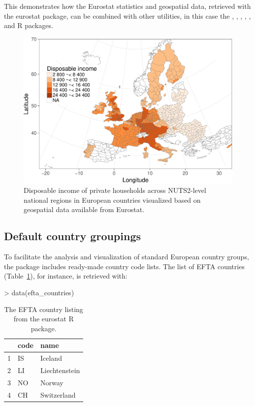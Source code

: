 This demonstrates how the Eurostat statistics and geospatial data,
retrieved with the eurostat package, can be combined with other
utilities, in this case the
 \citep{grid},  \citep{maptools},  \citep{rgdal},
 \citep{rgeos},  \citep{scales}, and
 \citep{stringr} R packages.

\begin{figure}
\begin{center}
\includegraphics{2015-manu-mapexample-1}
\caption{Disposable income of private households across NUTS2-level national regions in European countries visualized based on geospatial data available from Eurostat.}
\label{fig:mapexample}
\end{center}
\end{figure}


\subsection{Default country groupings}

To facilitate the analysis and visualization of standard European
country groups, the  package includes ready-made
country code lists. The list of EFTA countries (Table~\ref{tab:efta}),
for instance, is retrieved with:

\begin{example}
> data(efta_countries)
\end{example}

\begin{table}[h]
\centering
\begin{tabular}{rll}
\toprule
  \hline
  & code & name \\ 
  \hline
  1 & IS & Iceland \\ 
  2 & LI & Liechtenstein \\ 
  3 & NO & Norway \\ 
  4 & CH & Switzerland \\ 
   \hline
\bottomrule   
\end{tabular}
\caption{The EFTA country listing from the eurostat R package.}
\label{tab:efta}
\end{table}

